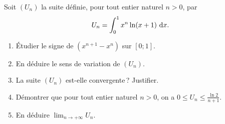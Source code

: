 %
\begin{exo}
            Soit $(U_n)$ la suite d\'efinie, pour tout entier naturel $n>0$, par
            \[
                  U_n=\int_{0}^{1}x^n\ln(x+1)~\mathrm{d}x.
            \]
            \begin{enumerate}
                  \item \'Etudier le signe de $(x^{n+1} - x^n)$ sur $[0 ; 1]$.
                  \item En d\'eduire le sens de variation de $(U_n)$.
                  \item La suite $(U_n)$ est-elle convergente\,? Justifier.
                  \item D\'emontrer que pour tout entier naturel $n>0$, on a $0 \leq U_n \leq \frac{\ln 2}{n+1}$.
                  \item En d\'eduire $\displaystyle{\lim_{n\rightarrow+\infty} U_n}$.
            \end{enumerate}
\end{exo}

